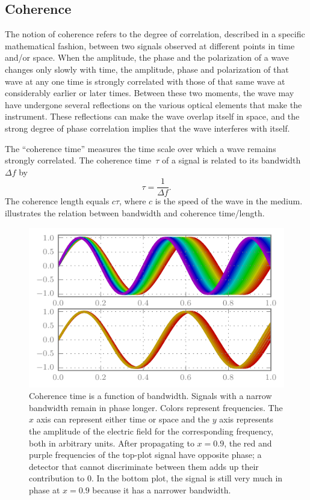 \subsection{Coherence}

The notion of coherence refers to the degree of correlation, described in a specific mathematical fashion, between two signals observed at different points in time and/or space.
When the amplitude, the phase and the polarization of a wave changes only slowly with time, the amplitude, phase and polarization of that wave at any one time is strongly correlated with those of that same wave at considerably earlier or later times.
Between these two moments, the wave may have undergone several reflections on the various optical elements that make the instrument.
These reflections can make the wave overlap itself in space, and the strong degree of phase correlation implies that the wave interferes with itself.

The ``coherence time'' measures the time scale over which a wave remains strongly correlated.
The coherence time~$\tau$ of a signal is related to its bandwidth~$\Delta f$ by
\begin{equation}
    \tau = \frac{1}{\Delta f} \text{.}
\end{equation}
The coherence length equals $c\tau$, where $c$ is the speed of the wave in the medium.
 illustrates the relation between bandwidth and coherence time/length.

\begin{figure}
    \centering
    \includegraphics[width=.8\textwidth]{coherence}
    \caption{
        Coherence time is a function of bandwidth.
        Signals with a narrow bandwidth remain in phase longer.
        Colors represent frequencies.
        The $x$ axis can represent either time or space and the $y$ axis represents the amplitude of the electric field for the corresponding frequency, both in arbitrary units.
        After propagating to $x=0.9$, the red and purple frequencies of the top-plot signal have opposite phase; a detector that cannot discriminate between them adds up their contribution to 0.
        In the bottom plot, the signal is still very much in phase at $x=0.9$
        because it has a narrower bandwidth.
    }
    \label{fig:coherence}
\end{figure}

